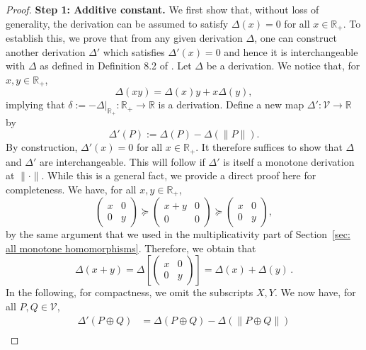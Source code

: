 \documentclass[aps,pra,11pt,onecolumn,nofootinbib,tightenlines]{revtex4-2}
\theoremstyle{definition}
\newcommand{\V}{\mathcal{V}}
\newcommand{\mb}[1]{\mathbb{#1}}
\begin{document}
\begin{proof}
\noindent\textbf{Step 1: Additive constant.} We first show that, without loss of generality, the derivation can be assumed to satisfy $\Delta(x) = 0$ for all $x \in \mathbb{R}_+$. To establish this, we prove that from any given derivation $\Delta$, one can construct another derivation $\Delta'$ which satisfies $\Delta'(x) =0$ and hence it is interchangeable with $\Delta$ as defined in Definition 8.2 of \cite{fritz2023abstractII}. Let $\Delta$ be a derivation.  We notice that, for $x,y\in\mb R_+$,
\begin{equation}
\Delta(xy)=\Delta(x)y+x\Delta(y),
\end{equation}
implying that $\delta:=-\Delta|_{\mb R_+}:\mb R_+\to\mb R$ is a derivation.
Define a new map $\Delta' \colon \mathcal{V} \to \mathbb{R}$ by
\begin{equation}
    \Delta'(P) := \Delta(P) - \Delta(\|P\|).
\end{equation}
By construction, $\Delta'(x) = 0$ for all $x \in \mathbb{R}_+$. It therefore suffices to show that $\Delta$ and $\Delta'$ are interchangeable. This will follow if $\Delta'$ is itself a monotone derivation at $\|\cdot\|$. While this is a general fact, we provide a direct proof here for completeness. We have, for all $x,y\in\mb R_+$,
\begin{equation}
\left(\begin{array}{cc}
x&0\\
0&y
\end{array}\right)\succeq\left(\begin{array}{cc}
x+y&0\\
0&0
\end{array}\right)\succeq\left(\begin{array}{cc}
x&0\\
0&y
\end{array}\right),
\end{equation}
by the same argument that we used in the multiplicativity part of Section~\ref{sec: all monotone homomorphisms}. Therefore, we obtain that
\begin{equation}
\Delta(x+y)=\Delta\left[\left(\begin{array}{cc}
x&0\\
0&y
\end{array}\right)\right]=\Delta(x)+\Delta(y)\,.
\end{equation}
In the following, for compactness, we omit the subscripts $X,Y$.
We now have, for all $P,Q\in\V$,
\begin{align}
\Delta'(P\oplus Q)&=\Delta(P\oplus Q)-\Delta(\|P\oplus Q\|)\\

\end{align}
\end{proof}
\end{document}
